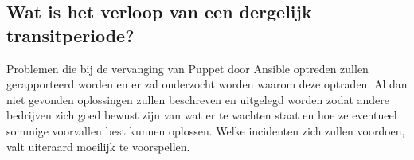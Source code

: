 \subsection{Wat is het verloop van een dergelijk transitperiode?}

Problemen die bij de vervanging van Puppet door Ansible optreden zullen gerapporteerd worden en er zal onderzocht worden waarom deze optraden. Al dan niet gevonden oplossingen zullen beschreven en uitgelegd worden zodat andere bedrijven zich goed bewust zijn van wat er te wachten staat en hoe ze eventueel sommige voorvallen best kunnen oplossen. Welke incidenten zich zullen voordoen, valt uiteraard moeilijk te voorspellen. 




